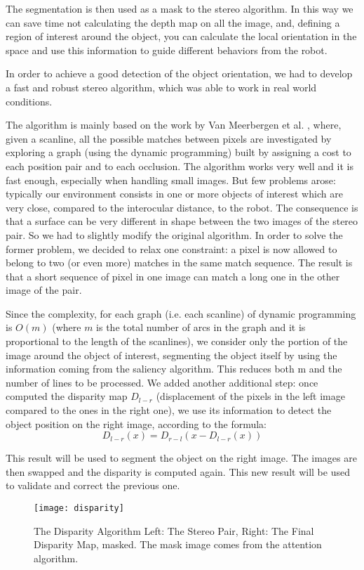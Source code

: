 The segmentation is then used as a mask to the stereo algorithm. In this way we can save time not calculating the depth map on all the image, and, defining a region of interest around the object, you can calculate the local orientation in the space and use this information to guide different behaviors from the robot.

In order to achieve a good detection of the object orientation, we had to develop a fast and robust stereo algorithm, which was able to work in real world conditions.

The algorithm is mainly based on the work by Van Meerbergen et al. \cite{merrbergen02stereo}, where, given a scanline, all the possible matches between pixels are investigated by exploring a graph (using the dynamic programming) built by assigning a cost to each position pair and to each occlusion. The algorithm works very well and it is fast enough, especially when handling small images. But few problems arose: typically our environment consists in one or more objects of interest which are very close, compared to the interocular distance, to the robot. The consequence is that a surface can be very different in shape between the two images of the stereo pair. So we had to slightly modify the original algorithm. In order to solve the former problem, we decided to relax one constraint: a pixel is now allowed to belong to two (or even more) matches in the same match sequence. The result is that a short sequence of pixel in one image can match a long one in the other image of the pair. 

Since the complexity, for each graph (i.e. each scanline) of dynamic programming is $O(m)$ (where $m$ is the total number of arcs in the graph and it is proportional to the length of the scanlines), we consider only the portion of the image around the object of interest, segmenting the object itself by using the information coming from the saliency algorithm. This reduces both m and the number of  lines to be processed.
We added another additional step: once computed the disparity map $D_{l-r}$ (displacement of the pixels in the left image compared to the ones in the right one), we use its information to detect the object position on the right image, according to the formula: 
\begin{equation}D_{l-r}(x)=D_{r-l}(x-D_{l-r}(x))\end{equation}

This result will be used to segment the object on the right image. The images are then swapped and the disparity is computed again. This new result will be used to validate and correct the previous one.

\begin{figure}
\centering
\texttt{[image: disparity]}
\caption{The Disparity Algorithm  Left: The Stereo Pair, Right: The Final Disparity Map, masked. The mask image comes from the attention algorithm.}
\label{disparity}
\end{figure}
